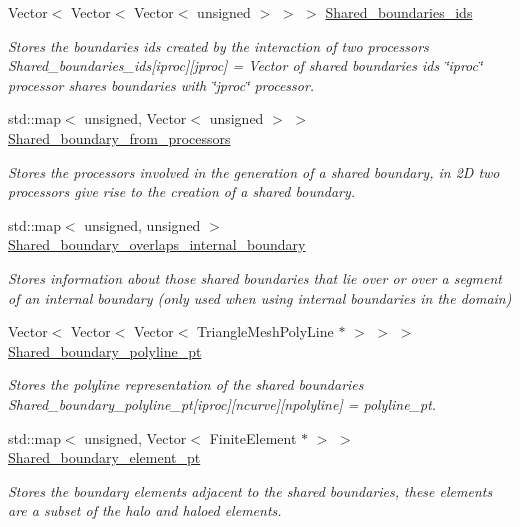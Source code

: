 \begin{DoxyCompactItemize}
Vector$<$ Vector$<$ Vector$<$ unsigned $>$ $>$ $>$ \hyperlink{classoomph_1_1TriangleMesh_a0a9ca3fff7a20de44410bb246becf0dc}{Shared\+\_\+boundaries\+\_\+ids}
\begin{DoxyCompactList}\small\item\em Stores the boundaries ids created by the interaction of two processors Shared\+\_\+boundaries\+\_\+ids\mbox{[}iproc\mbox{]}\mbox{[}jproc\mbox{]} = Vector of shared boundaries ids \char`\"{}iproc\char`\"{} processor shares boundaries with \char`\"{}jproc\char`\"{} processor. \end{DoxyCompactList}\item 
std\+::map$<$ unsigned, Vector$<$ unsigned $>$ $>$ \hyperlink{classoomph_1_1TriangleMesh_a48491979123f1e1ca1d669c52e255dc1}{Shared\+\_\+boundary\+\_\+from\+\_\+processors}
\begin{DoxyCompactList}\small\item\em Stores the processors involved in the generation of a shared boundary, in 2D two processors give rise to the creation of a shared boundary. \end{DoxyCompactList}\item 
std\+::map$<$ unsigned, unsigned $>$ \hyperlink{classoomph_1_1TriangleMesh_a1ac1fe24d9985f3e778b1362f00d2949}{Shared\+\_\+boundary\+\_\+overlaps\+\_\+internal\+\_\+boundary}
\begin{DoxyCompactList}\small\item\em Stores information about those shared boundaries that lie over or over a segment of an internal boundary (only used when using internal boundaries in the domain) \end{DoxyCompactList}\item 
Vector$<$ Vector$<$ Vector$<$ Triangle\+Mesh\+Poly\+Line $\ast$ $>$ $>$ $>$ \hyperlink{classoomph_1_1TriangleMesh_a88ca952f5e86d5cf5215811600ce6f0b}{Shared\+\_\+boundary\+\_\+polyline\+\_\+pt}
\begin{DoxyCompactList}\small\item\em Stores the polyline representation of the shared boundaries Shared\+\_\+boundary\+\_\+polyline\+\_\+pt\mbox{[}iproc\mbox{]}\mbox{[}ncurve\mbox{]}\mbox{[}npolyline\mbox{]} = polyline\+\_\+pt. \end{DoxyCompactList}\item 
std\+::map$<$ unsigned, Vector$<$ Finite\+Element $\ast$ $>$ $>$ \hyperlink{classoomph_1_1TriangleMesh_afa3e46babf3984371ce4da85b110b6fa}{Shared\+\_\+boundary\+\_\+element\+\_\+pt}
\begin{DoxyCompactList}\small\item\em Stores the boundary elements adjacent to the shared boundaries, these elements are a subset of the halo and haloed elements. \end{DoxyCompactList}\item 

\end{DoxyCompactItemize}
